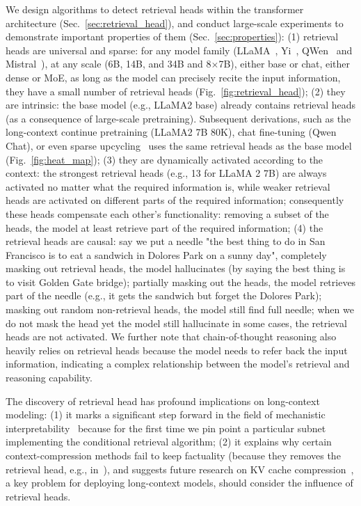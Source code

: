 We design algorithms to detect retrieval heads within the transformer architecture (Sec.~\ref{sec:retrieval_head}), and conduct large-scale experiments to demonstrate important properties of them (Sec.~\ref{sec:properties}):
(1) retrieval heads are universal and sparse: for any model family (LLaMA~\citep{touvron2023llama}, Yi~\citep{young2024yi}, QWen~\citep{bai2023qwen} and Mistral~\citep{jiang2023mistral}), at any scale (6B, 14B, and 34B and 8$\times$7B), either base or chat, either dense or MoE, as long as the model can precisely recite the input information, they have a small number of retrieval heads (Fig.~\ref{fig:retrieval_head});
(2) they are intrinsic: the base model (e.g., LLaMA2 base) already contains retrieval heads (as a consequence of large-scale pretraining). Subsequent derivations, such as the long-context continue pretraining (LLaMA2 7B 80K),  chat fine-tuning (Qwen Chat), or even sparse upcycling~\citep{komatsuzaki2022sparse, jiang2024mixtral} uses the same retrieval heads as the base model (Fig.~\ref{fig:heat_map}); 
(3) they are dynamically activated according to the context: the strongest retrieval heads (e.g., 13 for LLaMA 2 7B) are always activated no matter what the required information is, while weaker retrieval heads  are activated on different parts of the required information; consequently these heads compensate each other's functionality: removing a subset of the heads, the model at least retrieve part of the required information;
(4) the retrieval heads are causal: 
say we put a needle "the best thing to do in San Francisco is to eat a sandwich in Dolores Park on a sunny day",
completely masking out retrieval heads, the model hallucinates (by saying the best thing is to visit Golden Gate bridge); 
partially masking out the heads, the model retrieves part of the needle (e.g., it gets the sandwich but forget the Dolores Park);
masking out random non-retrieval heads, the model still find full needle; 
when we do not mask the head yet the model still hallucinate in some cases, 
the retrieval heads are not activated. 
We further note that chain-of-thought reasoning also heavily relies on retrieval heads because the model needs to refer back the input information, indicating a complex relationship between the model's retrieval and reasoning capability.

The discovery of retrieval head has profound implications on long-context modeling:
(1) it marks a significant step forward in the field of mechanistic interpretability~\citep{bricken2023monosemanticity, olsson2022context} because for the first time we pin point a particular subnet implementing the conditional retrieval algorithm;
(2) it explains why certain context-compression methods fail to keep factuality (because they removes the retrieval head, e.g., in~\citealt{xiao2023efficient}), and suggests future research on KV cache compression~\citep{ge2023model, kang2024gear}, a key problem for deploying long-context models, should consider the influence of retrieval heads. 